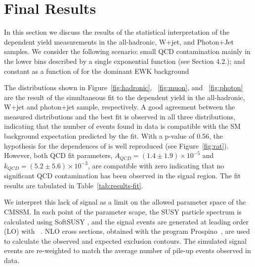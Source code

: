 \section{Final Results \label{sec:results}}

In this section we discuss the results of the statistical
interpretation of the \scalht dependent yield measurements in the
all-hadronic, W+jet, and Photon+Jet samples.  We consider the
following scenario: small QCD contamination mainly in the lower
\scalht bins described by a single exponential function (see Section
4.2.); and constant \RaT as a function of \scalht for the dominant EWK
background

The \scalht distributions shown in Figure~\ref{fig:hadronic},
~\ref{fig:muon}, and ~\ref{fig:photon} are the result of the
simultaneous fit to the \scalht dependent yield in the all-hadronic,
W+jet and photon+jet sample, respectively.  A good agreement between
the measured \scalht distributions and the best fit is observed in all
three distributions, indicating that the number of events found in
data is compatible with the SM background expectation predicted by the
fit.  With a p-value of 0.56, the hypothesis for the \scalht
dependences of \RaT is well reproduced (see Figure~\ref{fig:rat}).
However, both QCD fit parameters, $A_{QCD}=(1.4 \pm 1.9) \times
10^{-5}$ and $k_{QCD}=(5.2 \pm 5.6)\times 10^{-3}$, are compatible
with zero indicating that no significant QCD contamination has been
observed in the signal region.  The fit results are tabulated in
Table~\ref{tab:results-fit}.

We interpret this lack of signal as a limit on the allowed parameter
space of the CMSSM. In each point of the parameter scape, the SUSY
particle spectrum is calculated using SoftSUSY \cite{Allanach:2001kg},
and the signal events are generated at leading order (LO) with
~\cite{pythia}.  NLO cross sections, obtained with the
program Prospino~\cite{Beenakker:1996ch}, are used to calculate the
observed and expected exclusion contours. The simulated signal events
are re-weighted to match the average number of pile-up events observed
in data.

